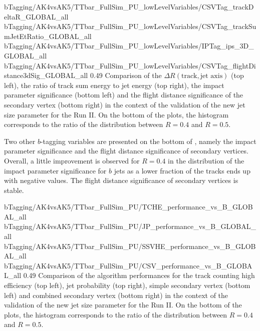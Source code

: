                       {bTagging/AK4vsAK5/TTbar_FullSim_PU_lowLevelVariables/CSVTag_trackDeltaR_GLOBAL_all}
                      {bTagging/AK4vsAK5/TTbar_FullSim_PU_lowLevelVariables/CSVTag_trackSumJetEtRatio_GLOBAL_all}
                      {bTagging/AK4vsAK5/TTbar_FullSim_PU_lowLevelVariables/IPTag_ips_3D_GLOBAL_all}
                      {bTagging/AK4vsAK5/TTbar_FullSim_PU_lowLevelVariables/CSVTag_flightDistance3dSig_GLOBAL_all}
                      {0.49}
                      {Comparison of the $\Delta R(\text{track},\text{jet
                      axis})$ (top left), the ratio of track sum energy to jet
                      energy (top right), the impact parameter significance
                      (bottom left) and the flight distance significance of the
                      secondary vertex (bottom right) in the context of the
                      validation of the new jet size parameter for the Run II.
                      On the bottom of the plots, the histogram corresponds to
                      the ratio of the distribution between $R = 0.4$ and $R =
                      0.5$.}

    Two other $b$-tagging variables are presented on the bottom of
    , namely
    the impact parameter significance and the flight distance significance of
    secondary vertices.  Overall, a little improvement is observed for $R = 0.4$
    in the distribution of the impact parameter significance for $b$ jets as a
    lower fraction of the tracks ends up with negative values. The flight
    distance significance of secondary vertices is stable.

                      {bTagging/AK4vsAK5/TTbar_FullSim_PU/TCHE_performance_vs_B_GLOBAL_all}
                      {bTagging/AK4vsAK5/TTbar_FullSim_PU/JP_performance_vs_B_GLOBAL_all}
                      {bTagging/AK4vsAK5/TTbar_FullSim_PU/SSVHE_performance_vs_B_GLOBAL_all}
                      {bTagging/AK4vsAK5/TTbar_FullSim_PU/CSV_performance_vs_B_GLOBAL_all}
                      {0.49}
                      {Comparison of the algorithm performances for the track
                      counting high efficiency (top left), jet probability (top
                      right), simple secondary vertex (bottom left) and combined
                      secondary vertex (bottom right) in the context of the
                      validation of the new jet size parameter for the Run II.
                      On the bottom of the plots, the histogram corresponds to
                      the ratio of the distribution between $R = 0.4$ and $R =
                      0.5$.  }


